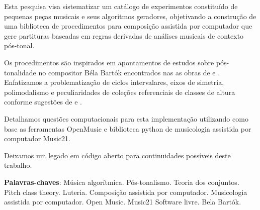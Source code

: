 \documentclass[
	12pt,				%
	openright,			%
	twoside,			%
	a4paper,			%
	english,			%
	french,				%
	spanish,			%
	brazil				%
	]{abntex2}
\begin{document}
\begin{resumo}


Esta pesquisa visa sistematizar um catálogo de experimentos constituído de pequenas peças musicais e seus algoritmos geradores, objetivando a construção de uma biblioteca de procedimentos para composição assistida por computador que gere partituras baseadas em regras derivadas de análises musicais de contexto pós-tonal.


Os procedimentos são inspirados em apontamentos de estudos sobre pós-tonalidade no compositor Béla Bartók encontrados nas as obras de  e  . Enfatizamos a problematização de ciclos intervalares, eixos de simetria, polimodalismo e peculiaridades de coleções referenciais de classes de altura conforme sugestões de 
 e .

Detalhamos questões computacionais para esta implementação utilizando como base as ferramentas OpenMusic e biblioteca python de musicologia assistida por computador Music21. 

Deixamos um legado em código aberto para continuidades possíveis deste trabalho.


 \textbf{Palavras-chaves}: Música algorítmica. Pós-tonalismo. Teoria dos conjuntos. Pitch class theory. Luteria. Composição assistida por computador. Musicologia assistida por computador. Open Music. Music21 Software livre. Bela Bartók.
\end{resumo}
\end{document}
